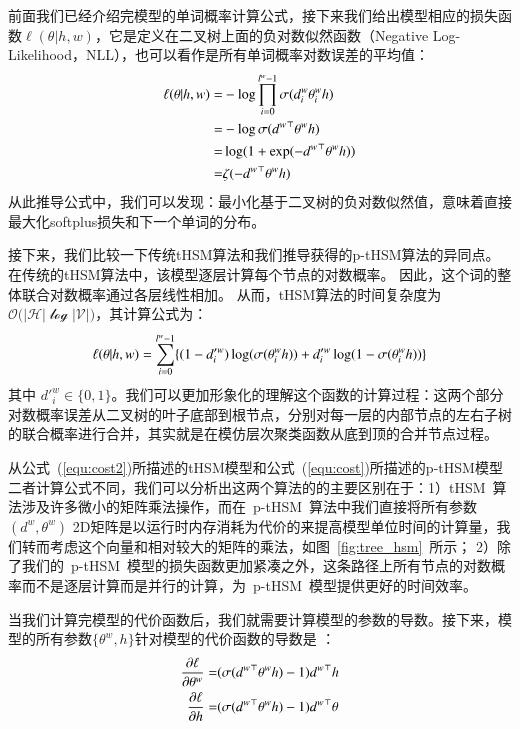 前面我们已经介绍完模型的单词概率计算公式，接下来我们给出模型相应的损失函数$ \ell(\theta | h,w)$，它是定义在二叉树上面的负对数似然函数（Negative Log-Likelihood，NLL），也可以看作是所有单词概率对数误差的平均值：
\begin{equation}\label{equ:cost}
\setlength{\abovedisplayskip}{6pt}
\setlength{\belowdisplayskip}{6pt}
\begin{split}
   \ell(\theta|h,w) =&-\log\prod_{i=0}^{l^w -1} \sigma(d_i^w \theta_{i}^w h) \\
   =& -\log \sigma({d^w}^\top \theta^w h)\\
    =& \log (1+\exp(- {d^w}^\top \theta^w h )) \\
    =&  \zeta(- {d^w}^\top \theta^w h )
\end{split}
\end{equation}
从此推导公式中，我们可以发现：最小化基于二叉树的负对数似然值，意味着直接最大化softplus损失和下一个单词的分布。

接下来，我们比较一下传统tHSM算法和我们推导获得的p-tHSM算法的异同点。在传统的tHSM算法中，该模型逐层计算每个节点的对数概率。 因此，这个词的整体联合对数概率通过各层线性相加。 从而，tHSM算法的时间复杂度为$\mathcal{O(|H|\log|V|})$，其计算公式为：
\begin{equation}\label{equ:cost2}
\setlength{\abovedisplayskip}{6pt}
\setlength{\belowdisplayskip}{6pt}
\ell(\theta|h,w) =\sum_{i=0}^{l^w-1} \{(1-d'^w_i)\log (\sigma(\theta_{i}^w h))  + {d'^w_i}\log (1-\sigma (\theta_{i}^w h))\}
\end{equation}
其中 $d'^w_i\in \{0,1\}$。我们可以更加形象化的理解这个函数的计算过程：这两个部分对数概率误差从二叉树的叶子底部到根节点，分别对每一层的内部节点的左右子树的联合概率进行合并，其实就是在模仿层次聚类函数从底到顶的合并节点过程。

从公式~(\ref{equ:cost2})所描述的tHSM模型和公式~(\ref{equ:cost})所描述的p-tHSM模型二者计算公式不同，我们可以分析出这两个算法的的主要区别在于：1）tHSM~算法涉及许多微小的矩阵乘法操作，而在~p-tHSM~算法中我们直接将所有参数$(d^w,\theta^w)$ 2D矩阵是以运行时内存消耗为代价的来提高模型单位时间的计算量，我们转而考虑这个向量和相对较大的矩阵的乘法，如图~\ref{fig:tree_hsm}~所示； 2）除了我们的~p-tHSM~模型的损失函数更加紧凑之外，这条路径上所有节点的对数概率而不是逐层计算而是并行的计算，为~p-tHSM~模型提供更好的时间效率。

当我们计算完模型的代价函数后，我们就需要计算模型的参数的导数。接下来，模型的所有参数$\{\theta^w,h\}$针对模型的代价函数的导数是 ：
\begin{equation}
\setlength{\abovedisplayskip}{6pt}
\setlength{\belowdisplayskip}{6pt}
\begin{split}
\frac{\partial \ell}{\partial \theta^w}=&(\sigma({d^w}^\top\theta^w h) -1){d^w}^\top h \\
\frac{\partial \ell}{\partial h}=&(\sigma({d^w}^\top \theta^w h) -1){d^w}^\top \theta
\end{split}
\end{equation}


